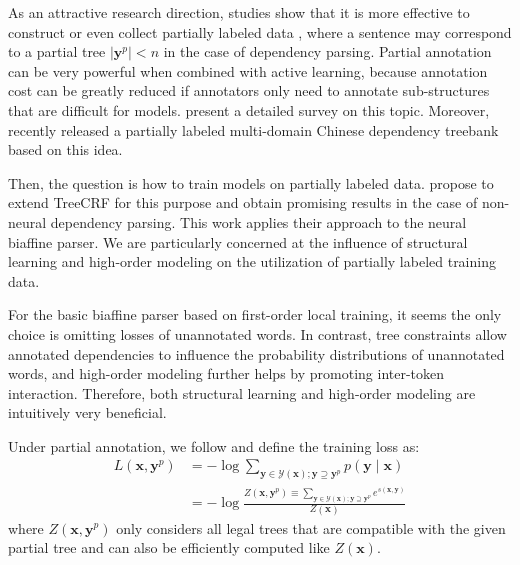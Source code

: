 \documentclass[11pt,a4paper]{article}
\begin{document}
As an attractive research direction, studies show that
 it is more effective to construct or even collect partially labeled data \cite{nivre-etal-2014-squibs,hwa-99-partial-annotation,pereira-92-inside-outside},
 where a sentence may correspond to a partial tree $|{\boldsymbol{y}^p}| < n$ in the case of dependency parsing.
Partial annotation can be very powerful when combined with active learning, because
annotation cost can be greatly reduced if annotators only need to annotate sub-structures that are difficult for models. \citet{li-etal-2016-active} present a detailed survey on this topic.
Moreover, \citet{peng2019overview} recently released a partially labeled multi-domain Chinese dependency treebank based on this idea.

Then, the question is how to train models on partially labeled data.
\citet{li-etal-2016-active} propose to extend TreeCRF for this purpose and obtain promising results
in the case of non-neural dependency parsing.
This work applies their approach to the neural biaffine parser.
We are particularly concerned at the influence of structural learning and high-order modeling on the utilization of partially labeled training data.

For the basic biaffine parser based on first-order local training, it seems  the only choice is omitting losses of unannotated words.
In contrast, tree constraints allow annotated dependencies to influence the
probability distributions of unannotated words, and high-order modeling further helps by promoting inter-token interaction.
Therefore, both structural learning and high-order modeling are intuitively very beneficial.

Under partial annotation, we follow \citet{li-etal-2016-active} and define the training loss as:
\begin{equation}
\label{equation:training-loss-treecrf-partial}
\begin{split}
\mathit{L}(\boldsymbol{x}, {\boldsymbol{y}^p}) &= -\log \sum\limits_{\boldsymbol{y} \in \mathcal{Y}(\boldsymbol{x}); \boldsymbol{y} \supseteq {\boldsymbol{y}^p}} p(\boldsymbol{y}\mid\boldsymbol{x})  \\
&= - \log \frac{Z(\boldsymbol{x}, {\boldsymbol{y}^p}) \equiv \sum\limits_{\boldsymbol{y} \in \mathcal{Y}(\boldsymbol{x}); \boldsymbol{y} \supseteq \boldsymbol{y}^p} e^{s(\boldsymbol{x},\boldsymbol{y})}}{Z(\boldsymbol{x})}
\end{split}
\end{equation}
where $Z(\boldsymbol{x}, {\boldsymbol{y}^p})$ only considers all legal trees that are compatible with the given partial tree and can also be efficiently computed like $Z(\boldsymbol{x})$.
\end{document}
